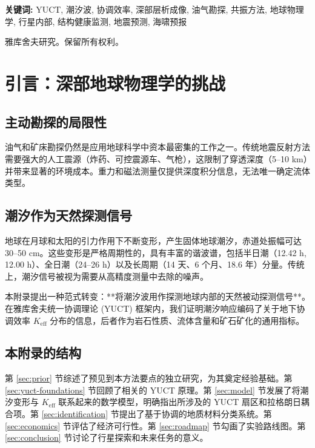 \documentclass[12pt,a4paper]{article}
\theoremstyle{remark}
\newcommand{\Keff}{K_{\mathrm{eff}}}
\begin{document}
\begin{titlepage}
\begin{center}
			\vspace{1cm}
			
			\noindent
			\small\textbf{关键词:} YUCT, 潮汐波, 协调效率, 深部层析成像, 油气勘探, 共振方法, 地球物理学, 行星内部, 结构健康监测, 地震预测, 海啸预报
			
			\vspace{0.5cm}
			
			\noindent
			 雅库舍夫研究。保留所有权利。
		\end{center}
	\end{titlepage}
	
	\tableofcontents
	\newpage
	
	\section{引言：深部地球物理学的挑战}
	\label{sec:intro}
	
	\subsection{主动勘探的局限性}
	
	油气和矿床勘探仍然是应用地球科学中资本最密集的工作之一。传统地震反射方法需要强大的人工震源（炸药、可控震源车、气枪），这限制了穿透深度（5–10 km）并带来显著的环境成本。重力和磁法测量仅提供深度积分信息，无法唯一确定流体类型。
	
	\subsection{潮汐作为天然探测信号}
	
	地球在月球和太阳的引力作用下不断变形，产生固体地球潮汐，赤道处振幅可达 30–50 cm。这些变形是严格周期性的，具有丰富的谐波谱，包括半日潮（12.42 h, 12.00 h）、全日潮（24–26 h）以及长周期（14 天、6 个月、18.6 年）分量。传统上，潮汐信号被视为需要从高精度测量中去除的噪声。
	
	本附录提出一种范式转变：**将潮汐波用作探测地球内部的天然被动探测信号**。在雅库舍夫统一协调理论 (YUCT) 框架内，我们证明潮汐响应编码了关于地下协调效率 $\Keff$ 分布的信息，后者作为岩石性质、流体含量和矿石矿化的通用指标。
	
	\subsection{本附录的结构}
	
	第 \ref{sec:prior} 节综述了预见到本方法要点的独立研究，为其奠定经验基础。第 \ref{sec:yuct-foundations} 节回顾了相关的 YUCT 原理。第 \ref{sec:model} 节发展了将潮汐变形与 $\Keff$ 联系起来的数学模型，明确指出所涉及的 YUCT 扇区和拉格朗日耦合项。第 \ref{sec:identification} 节提出了基于协调的地质材料分类系统。第 \ref{sec:economics} 节评估了经济可行性。第 \ref{sec:roadmap} 节勾画了实验路线图。第 \ref{sec:conclusion} 节讨论了行星探索和未来任务的意义。
	
\end{document}
